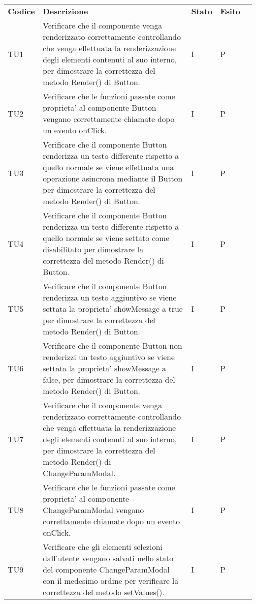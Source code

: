 \begin{longtable} {
		>{}p{15mm} 
		>{}p{79.5mm}
		>{}p{15mm} 
		>{}p{15mm}
		>{}p{0mm}}
	\rowcolor{gray!50}
	\textbf{Codice} & \textbf{Descrizione} & \textbf{Stato} & \textbf{Esito} &\TBstrut \\
	TU1		& Verificare che il componente venga renderizzato correttamente controllando che venga effettuata la renderizzazione degli elementi contenuti al suo interno, per dimostrare la correttezza del metodo Render() di  Button.& I & P &\TBstrut \\ [2mm]
	TU2		& Verificare che le funzioni passate come proprieta' al componente Button vengano correttamente chiamate dopo un evento onClick.& I & P &\TBstrut \\ [2mm]
	TU3		& Verificare che il componente Button renderizza un testo differente rispetto a quello normale se viene effettuata una operazione asincrona mediante il Button per dimostrare la correttezza del metodo Render() di  Button.& I & P &\TBstrut \\ [2mm]
	TU4		& Verificare che il componente Button renderizza un testo differente rispetto a quello normale se viene settato come disabilitato per dimostrare la correttezza del metodo Render() di Button.& I & P &\TBstrut \\ [2mm]
	TU5		& Verificare che il componente Button renderizza un testo aggiuntivo se viene settata la proprieta' showMessage a true per dimostrare la correttezza del metodo Render() di  Button.& I & P &\TBstrut \\ [2mm]
	TU6		& Verificare che il componente Button non renderizzi un testo aggiuntivo se viene settata la proprieta' showMessage a false, per dimostrare la correttezza del metodo Render() di  Button.& I & P &\TBstrut \\ [2mm]
	TU7		& Verificare che il componente venga renderizzato correttamente controllando che venga effettuata la renderizzazione degli elementi contenuti al suo interno, per dimostrare la correttezza del metodo Render() di  ChangeParamModal.& I & P &\TBstrut \\ [2mm]
	TU8		& Verificare che le funzioni passate come proprieta' al componente ChangeParamModal vengano correttamente chiamate dopo un evento onClick.& I & P &\TBstrut \\ [2mm]
	TU9		& Verificare che gli elementi selezioni dall'utente vengano salvati nello stato del componente ChangeParamModal con il medesimo ordine per verificare la correttezza del metodo setValues().& I & P &\TBstrut \\ [2mm]

\end{longtable}
